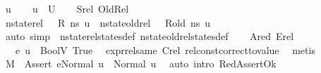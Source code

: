 \begin{isabellebody}
\ u\isanewline
\ \ \isamarkupfalse%
\ {\isachardoublequoteopen}u\ {\isasymin}\ U{\isachardoublequoteclose}\isanewline
\ \ \isamarkupfalse%
\ Srel\ OldRel\ \isamarkupfalse%
\ {\isachardoublequoteopen}nstate{\isacharunderscore}{\kern0pt}rel\ {\isasymLambda}\ {\isasymLambda}{\isacharprime}{\kern0pt}\ R\ ns\ u{\isachardoublequoteclose}\ \ {\isachardoublequoteopen}nstate{\isacharunderscore}{\kern0pt}old{\isacharunderscore}{\kern0pt}rel\ {\isasymLambda}\ {\isasymLambda}{\isacharprime}{\kern0pt}\ R{\isacharunderscore}{\kern0pt}old\ ns\ u{\isachardoublequoteclose}\ \ \ \ \isanewline
\ \ \ \ \isamarkupfalse%
\ {\isacharparenleft}{\kern0pt}auto\ simp{\isacharcolon}{\kern0pt}\ \ nstate{\isacharunderscore}{\kern0pt}rel{\isacharunderscore}{\kern0pt}states{\isacharunderscore}{\kern0pt}def\ nstate{\isacharunderscore}{\kern0pt}old{\isacharunderscore}{\kern0pt}rel{\isacharunderscore}{\kern0pt}states{\isacharunderscore}{\kern0pt}def{\isacharparenright}{\kern0pt}\isanewline
\ \ \isamarkupfalse%
\ Ared\ Erel\ \isamarkupfalse%
\ {\isachardoublequoteopen}{\isasymLambda}{\isacharprime}{\kern0pt}{\isacharcomma}{\kern0pt}{\isasymGamma}{\isacharcomma}{\kern0pt}{\isasymOmega}\ {\isasymturnstile}\ {\isasymlangle}e{}{\isacharcomma}{\kern0pt}\ u{\isasymrangle}\ {\isasymDown}\ {\isacharparenleft}{\kern0pt}BoolV\ True{\isacharparenright}{\kern0pt}{\isachardoublequoteclose}\ \isamarkupfalse%
\ expr{\isacharunderscore}{\kern0pt}rel{\isacharunderscore}{\kern0pt}same{\isacharparenleft}{\kern0pt}{}{\isacharparenright}{\kern0pt}\ Crel\ rel{\isacharunderscore}{\kern0pt}const{\isacharunderscore}{\kern0pt}correct{\isacharunderscore}{\kern0pt}to{\isacharunderscore}{\kern0pt}value\ \isamarkupfalse%
\ metis\isanewline
\ \ \isamarkupfalse%
\ {\isachardoublequoteopen}M{\isacharcomma}{\kern0pt}{\isasymLambda}{\isacharprime}{\kern0pt}{\isacharcomma}{\kern0pt}{\isasymGamma}{\isacharcomma}{\kern0pt}{\isasymOmega}\ {\isasymturnstile}\ {\isasymlangle}Assert\ e{}{\isacharcomma}{\kern0pt}Normal\ u{\isasymrangle}\ {\isasymrightarrow}\ Normal\ u{\isachardoublequoteclose}\ \isamarkupfalse%
\ {\isacharparenleft}{\kern0pt}auto\ intro{\isacharcolon}{\kern0pt}\ RedAssertOk{\isacharparenright}{\kern0pt}\isanewline
{}\isamarkupfalse%
%
\endisatagproof
{\isafoldproof}%
%
\isadelimproof
\isanewline
%
\endisadelimproof
\isanewline
{}\isamarkupfalse%

\end{isabellebody}
